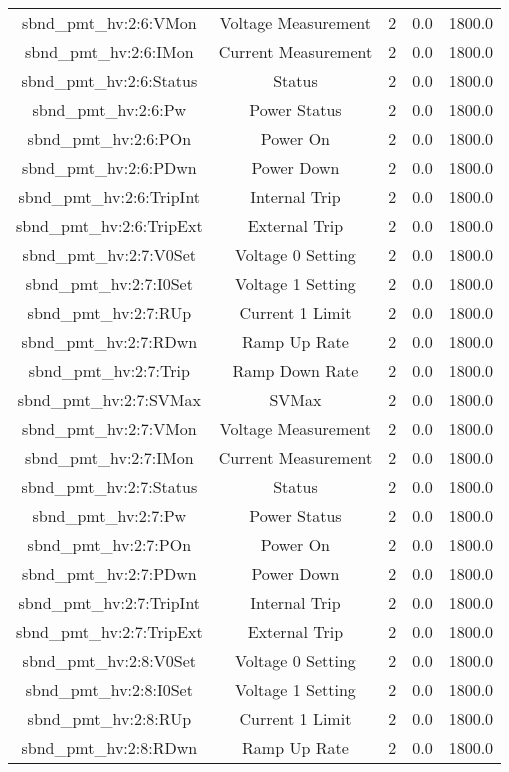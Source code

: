\begin{center}
\begin{longtable}{c | c c c c }
sbnd\_pmt\_hv:2:6:VMon & Voltage Measurement & 2 & 0.0 & 1800.0\\ 
sbnd\_pmt\_hv:2:6:IMon & Current Measurement & 2 & 0.0 & 1800.0\\ 
sbnd\_pmt\_hv:2:6:Status & Status & 2 & 0.0 & 1800.0\\ 
sbnd\_pmt\_hv:2:6:Pw & Power Status & 2 & 0.0 & 1800.0\\ 
sbnd\_pmt\_hv:2:6:POn & Power On & 2 & 0.0 & 1800.0\\ 
sbnd\_pmt\_hv:2:6:PDwn & Power Down & 2 & 0.0 & 1800.0\\ 
sbnd\_pmt\_hv:2:6:TripInt & Internal Trip & 2 & 0.0 & 1800.0\\ 
sbnd\_pmt\_hv:2:6:TripExt & External Trip & 2 & 0.0 & 1800.0\\ 
sbnd\_pmt\_hv:2:7:V0Set & Voltage 0 Setting & 2 & 0.0 & 1800.0\\ 
sbnd\_pmt\_hv:2:7:I0Set & Voltage 1 Setting & 2 & 0.0 & 1800.0\\ 
sbnd\_pmt\_hv:2:7:RUp & Current 1 Limit & 2 & 0.0 & 1800.0\\ 
sbnd\_pmt\_hv:2:7:RDwn & Ramp Up Rate & 2 & 0.0 & 1800.0\\ 
sbnd\_pmt\_hv:2:7:Trip & Ramp Down Rate & 2 & 0.0 & 1800.0\\ 
sbnd\_pmt\_hv:2:7:SVMax & SVMax & 2 & 0.0 & 1800.0\\ 
sbnd\_pmt\_hv:2:7:VMon & Voltage Measurement & 2 & 0.0 & 1800.0\\ 
sbnd\_pmt\_hv:2:7:IMon & Current Measurement & 2 & 0.0 & 1800.0\\ 
sbnd\_pmt\_hv:2:7:Status & Status & 2 & 0.0 & 1800.0\\ 
sbnd\_pmt\_hv:2:7:Pw & Power Status & 2 & 0.0 & 1800.0\\ 
sbnd\_pmt\_hv:2:7:POn & Power On & 2 & 0.0 & 1800.0\\ 
sbnd\_pmt\_hv:2:7:PDwn & Power Down & 2 & 0.0 & 1800.0\\ 
sbnd\_pmt\_hv:2:7:TripInt & Internal Trip & 2 & 0.0 & 1800.0\\ 
sbnd\_pmt\_hv:2:7:TripExt & External Trip & 2 & 0.0 & 1800.0\\ 
sbnd\_pmt\_hv:2:8:V0Set & Voltage 0 Setting & 2 & 0.0 & 1800.0\\ 
sbnd\_pmt\_hv:2:8:I0Set & Voltage 1 Setting & 2 & 0.0 & 1800.0\\ 
sbnd\_pmt\_hv:2:8:RUp & Current 1 Limit & 2 & 0.0 & 1800.0\\ 
sbnd\_pmt\_hv:2:8:RDwn & Ramp Up Rate & 2 & 0.0 & 1800.0\\ 

\end{longtable}
\end{center}
